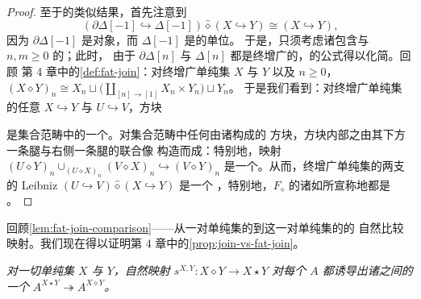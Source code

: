 \begin{proof}
至于\trFatJoin{}的类似结果，首先注意到
\begin{equation*}
(\partial\Delta[-1]\hookrightarrow\Delta[-1])\mathbin{\hat{\diamond}}
(X\hookrightarrow Y)\cong(X\hookrightarrow Y)\mbox{,}
\end{equation*}
因为 $\partial\Delta[-1]$ 是\trInitial{}对象，而 $\Delta[-1]$ 是\trFatJoin{}的单位。
于是，只须考虑诸\trSimplex{}\trBoundary{}包含与 $n,m\ge 0$ 的\trLeibnizProduct；此时，
由于 $\partial\Delta[n]$ 与 $\Delta[n]$ 都是终增广的，\trFatJoin{}的公式得以化简。回顾
第 4 章中的\cref{def:fat-join}：对终增广单纯集 $X$ 与 $Y$ 以及 $n\ge 0$，
$(X\diamond Y)_{n}\cong X_{n}\sqcup\bigl(\coprod_{[n]\to[1]}X_{n}\times Y_{n}\bigr)\sqcup Y_{n}$。
于是我们看到：对终增广单纯集的任意\trMonomorphism{} $X\hookrightarrow Y$ 与
$U\hookrightarrow V$，方块
\begin{center}
\end{center}
是集合范畴中的一个\trPullback。对集合范畴中任何由诸\trMonomorphism{}构成的%
\trPullback{}方块，方块内部之\trPushout{}由其下方一条腿与右侧一条腿的联合像
构造而成：特别地，映射
$(U\diamond Y)_{n}\cup_{(U\diamond X)_{n}}(V\diamond X)_{n}\hookrightarrow(V\diamond Y)_{n}$
是一个\trMonomorphism。从而，终增广单纯集的两支\trMonomorphism{}的 Leibniz
\trFatJoin $(U\hookrightarrow V)\mathbin{\hat{\diamond}}(X\hookrightarrow Y)$ 是一个%
\trMonomorphism，特别地，$F_{\diamond}$ 的诸\trLatchingMap{}如所宣称地都是%
\trMonomorphism。
\end{proof}

回顾\cref{lem:fat-join-comparison}——从一对单纯集的\trFatJoin{}到这一对单纯集的\trJoin{}的
自然比较映射。我们现在得以证明第 4 章中的\cref{prop:join-vs-fat-join}。

\begin{proposition}\label{prop:fat-join-comparison-weak-equivalence}
\emph{对一切单纯集 $X$ 与 $Y$，自然映射 $s^{X,Y}\colon X\diamond Y\to X\star Y$
对每个\trQuasiCategory{} $A$ 都诱导出诸\trQuasiCategory{}之间的一个%
\trEquivalence}
$A^{X\star Y}\twoheadrightarrow A^{X\diamond Y}$\emph{。}
\end{proposition}

